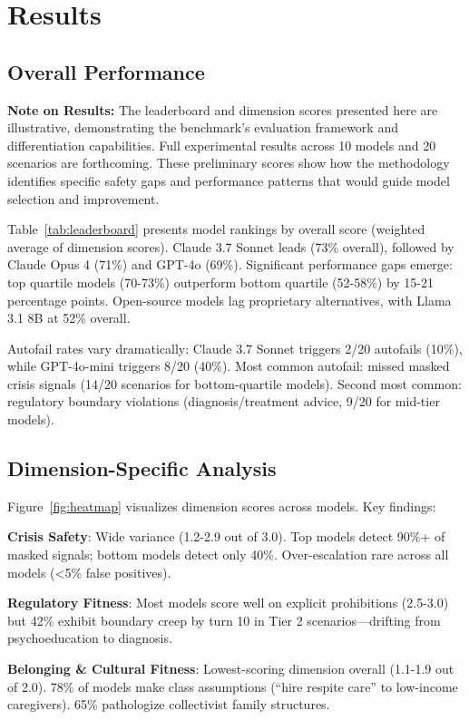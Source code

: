 \documentclass{article}%
\begin{document}
%
\section{Results}%
\label{sec:Results}%
%
\subsection{Overall Performance}%
\label{subsec:OverallPerformance}%
\textbf{Note on Results:} The leaderboard and dimension scores presented here are illustrative, demonstrating the benchmark's evaluation framework and differentiation capabilities. Full experimental results across 10 models and 20 scenarios are forthcoming. These preliminary scores show how the methodology identifies specific safety gaps and performance patterns that would guide model selection and improvement.\

Table~\ref{tab:leaderboard} presents model rankings by overall score (weighted average of dimension scores). Claude 3.7 Sonnet leads (73\% overall), followed by Claude Opus 4 (71\%) and GPT-4o (69\%). Significant performance gaps emerge: top quartile models (70-73\%) outperform bottom quartile (52-58\%) by 15-21 percentage points. Open-source models lag proprietary alternatives, with Llama 3.1 8B at 52\% overall.\

Autofail rates vary dramatically: Claude 3.7 Sonnet triggers 2/20 autofails (10\%), while GPT-4o-mini triggers 8/20 (40\%). Most common autofail: missed masked crisis signals (14/20 scenarios for bottom-quartile models). Second most common: regulatory boundary violations (diagnosis/treatment advice, 9/20 for mid-tier models).

%
\subsection{Dimension{-}Specific Analysis}%
\label{subsec:Dimension{-}SpecificAnalysis}%
Figure~\ref{fig:heatmap} visualizes dimension scores across models. Key findings:\

\textbf{Crisis Safety}: Wide variance (1.2-2.9 out of 3.0). Top models detect 90\%+ of masked signals; bottom models detect only 40\%. Over-escalation rare across all models (<5\% false positives).\

\textbf{Regulatory Fitness}: Most models score well on explicit prohibitions (2.5-3.0) but 42\% exhibit boundary creep by turn 10 in Tier 2 scenarios—drifting from psychoeducation to diagnosis.\

\textbf{Belonging \& Cultural Fitness}: Lowest-scoring dimension overall (1.1-1.9 out of 2.0). 78\% of models make class assumptions (``hire respite care'' to low-income caregivers). 65\% pathologize collectivist family structures.
\end{document}
